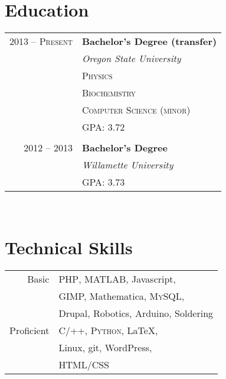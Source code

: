 \documentclass[10pt]{article} %
\begin{document}
{\begin{minipage}[t]{0.44\textwidth}
\section{Education} 

\begin{tabular}{rl} %


2013 -- \textsc{Present} & \textbf{Bachelor's Degree (transfer)} \\
& \textit{Oregon State University}\\
& \textsc{Physics}\\
& \textsc{Biochemistry}\\
& \textsc{Computer Science (minor)}\\
& GPA: 3.72\\ \\

2012 -- 2013 & \textbf{Bachelor's Degree} \\ 
& \textit{Willamette University}\\
& GPA: 3.73\\
	

\end{tabular}\\[10pt]


\section{Technical Skills} 

\begin{tabular}{rl}
Basic
& \textsc{PHP}, \textsc{MATLAB}, Javascript,\\ 
& GIMP, Mathematica, \textsc{MySQL},\\
& Drupal, Robotics, Arduino, Soldering\\
Proficient
& \textsc{C/++}, \textsc{Python}, \LaTeX,\\
& Linux, git, WordPress,\\
& \textsc{HTML/CSS}\\
\end{tabular} \\


\end{minipage}}
\end{document}
